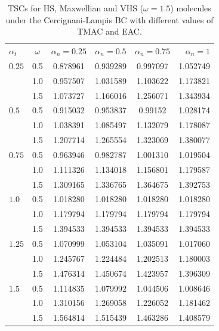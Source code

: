 \begin{table}[t]
	\centering
	\caption{\label{table_CL}TSCs  for HS, Maxwellian and VHS ($\omega=1.5$) molecules under the Cercignani-Lampis  BC  with different values of TMAC and EAC.}
		\begin{tabular}{lccccr}
			\hline
			$\alpha_t$  & $\omega$
			&  $\alpha_n=0.25$ & $ \alpha_n=0.5$  &    $\alpha_n=0.75$ &    $\alpha_n= 1$\\
			$0.25$
			& 0.5   & 0.878961  & 0.939289   & 0.997097 &  1.052749  \\
			&1.0    & 0.957507  & 1.031589   & 1.103622 &  1.173821  \\
			&1.5    & 1.073727  & 1.166016   & 1.256071 &  1.343934  \\
			$0.5$
			& 0.5   & 0.915032   & 0.953837   & 0.99152 & 1.028174  \\
			&1.0    & 1.038391   & 1.085497   & 1.132079 & 1.178087  \\
			&1.5    & 1.207714   & 1.265554   & 1.323069 &  1.380077  \\
			
			$0.75$
			& 0.5   & 0.963946   & 0.982787   & 1.001310  & 1.019504 \\
			&1.0    & 1.111326   & 1.134018   & 1.156801  & 1.179587\\
			&1.5    & 1.309165   & 1.336765   & 1.364675 & 1.392753  \\
			$1.0$
			& 0.5   & 1.018280   & 1.018280   & 1.018280 & 1.018280 \\
			&1.0    & 1.179794   & 1.179794   & 1.179794 & 1.179794 \\
			&1.5    & 1.394533   & 1.394533   & 1.394533 & 1.394533  \\
			
			$1.25$
			& 0.5   & 1.070999   & 1.053104   & 1.035091 &  1.017060 \\
			&1.0    & 1.245767   & 1.224484   & 1.202513  & 1.180003 \\
			&1.5    & 1.476314   & 1.450674   &1.423957 &  1.396309  \\
			
			$1.5$
			& 0.5   & 1.114835   & 1.079992   & 1.044506 & 1.008646 \\
			&1.0    & 1.310156   & 1.269058   & 1.226052 & 1.181462 \\
			&1.5    & 1.564814   & 1.515439   & 1.463286 & 1.408579  \\
			

\end{tabular}
\end{table}

